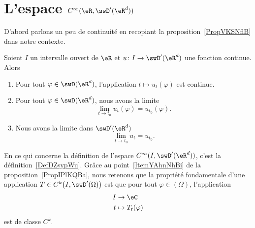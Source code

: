 \section{L'espace \texorpdfstring{$  C^{\infty}(\eR,\swD'(\eR^d))$}{C(R,D')}}
\label{SecTEgDVWO}

D'abord parlons un peu de continuité en recopiant la proposition~\ref{PropVKSNflB} dans notre contexte.
\begin{proposition}     \label{PropIPlKQBa}
    Soient \( I\) un intervalle ouvert de \( \eR\) et \( u\colon I\to \swD'(\eR^d)\) une fonction continue. Alors
    \begin{enumerate}
        \item   \label{ItemYAhnNhBi}
            Pour tout \( \varphi\in\swD(\eR^d)\), l'application \( t\mapsto u_t(\varphi)\) est continue.
        \item
            Pour tout \( \varphi\in\swD(\eR^d)\), nous avons la limite
            \begin{equation}
                \lim_{t\to t_0} u_t(\varphi)=u_{t_0}(\varphi).
            \end{equation}
        \item
            Nous avons la limite dans \( \swD'(\eR^d)\)
            \begin{equation}
                \lim_{t\to t_0} u_t=u_{t_0}.
            \end{equation}
    \end{enumerate}
\end{proposition}
En ce qui concerne la définition de l'espace \( C^{\infty}(I,\swD'(\eR^d))\), c'est la définition~\ref{DefDZsypWu}. Grâce au point~\ref{ItemYAhnNhBi} de la proposition~\ref{PropIPlKQBa}, nous retenons que la propriété fondamentale d'une application \( T\in C^k\big( I,\swD'(\Omega) \big)\) est que pour tout \( \varphi\in(\Omega)\), l'application
\begin{equation}
    \begin{aligned}
         I&\to \eC \\
        t&\mapsto T_t(\varphi)
    \end{aligned}
\end{equation}
est de classe \( C^k\).

